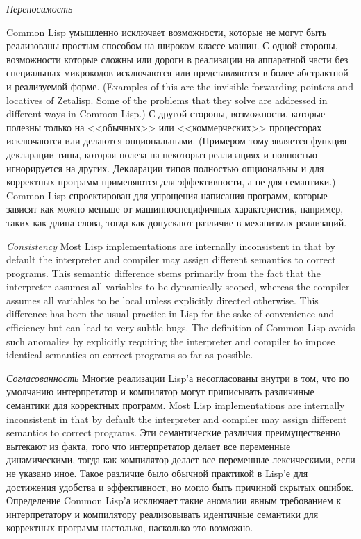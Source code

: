 \begin{flushdesc}
\item[\textit{Переносимость}]

\begingroup{}
Common Lisp умышленно исключает возможности, которые не могут быть
реализованы простым способом на широком классе машин. С одной
стороны, возможности которые сложны или дороги в реализации на
аппаратной части без специальных микрокодов исключаются или
представляются в более абстрактной и реализуемой форме.
(Examples of this are the invisible forwarding pointers
and locatives of Zetalisp.  Some of the problems that they solve
are addressed in different ways in Common Lisp.)
С другой стороны, возможности, которые полезны только на
<<обычных>> или <<коммерческих>> процессорах исключаются или
делаются опциональными. (Примером тому является функция декларации
типы, которая полеза на некоторыз реализациях и полностью
игнорируется на других. Декларации типов полностью опциональны и
для корректных программ применяются для эффективности, а не для семантики.)
Common Lisp спроектирован для упрощения написания программ,
которые зависят как можно меньше от машинноспецифичных
характеристик, например, таких как длина слова, тогда как
допускают различие в механизмах реализаций.
\par\endgroup

\item[\textit{Consistency}]
Most Lisp implementations are internally inconsistent
in that by default the interpreter and compiler may assign different
semantics to correct programs.
This semantic difference stems primarily from the fact
that the interpreter assumes all variables to be dynamically scoped,
whereas the compiler assumes all variables to be local unless explicitly
directed otherwise.  This difference has been the usual practice in Lisp
for the sake of convenience
and efficiency but can lead to very subtle bugs.  The definition of
Common Lisp avoids such anomalies by explicitly requiring the interpreter
and compiler to impose identical semantics on correct programs
so far as possible.

\item[\textit{Согласованность}]
Многие реализации Lisp'а несогласованы внутри в том, что по
умолчанию интерпретатор и компилятор могут приписывать различиные
семантики для корректных программ.
Most Lisp implementations are internally inconsistent
in that by default the interpreter and compiler may assign different
semantics to correct programs.
Эти семантические различия преимущественно вытекают из факта, того
что интерпретатор делает все переменные динамическими, тогда как
компилятор делает все переменные лексическими, если не указано
иное. Такое различие было обычной практикой в Lisp'е для
достижения удобства и эффективност, но могло быть причиной скрытых
ошибок. Определение Common Lisp'а исключает такие аномалии явным
требованием к интерпретатору и компилятору реализовывать
идентичные семантики для корректных программ настолько, насколько
это возможно.


\end{flushdesc}
